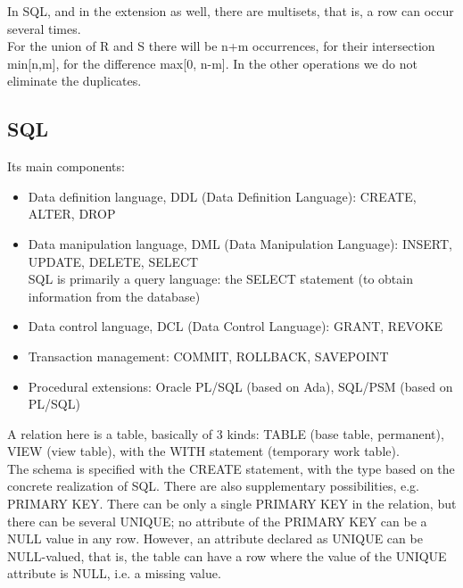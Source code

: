 \documentclass[margin=0px]{article}
\begin{document}
In SQL, and in the extension as well, there are multisets, that is, a row can occur several times. \\
For the union of R and S there will be n+m occurrences, for their intersection min[n,m], for the difference max[0, n-m]. In the other operations we do not eliminate the duplicates.

\subsection{SQL}

Its main components:
\begin{itemize}
    \item Data definition language, DDL (Data Definition Language): CREATE, ALTER, DROP
    \item Data manipulation language, DML (Data Manipulation Language): INSERT, UPDATE, DELETE, SELECT \\
          SQL is primarily a query language: the SELECT statement (to obtain information from the database)
    \item Data control language, DCL (Data Control Language): GRANT, REVOKE
    \item Transaction management: COMMIT, ROLLBACK, SAVEPOINT
    \item Procedural extensions: Oracle PL/SQL (based on Ada), SQL/PSM (based on PL/SQL)
\end{itemize}
A relation here is a table, basically of 3 kinds: TABLE (base table, permanent), VIEW (view table), with the WITH statement (temporary work table).\\
The schema is specified with the CREATE statement, with the type based on the concrete realization of SQL. There are also supplementary possibilities, e.g. PRIMARY KEY. There can be only a single PRIMARY KEY in the relation, but there can be several UNIQUE; no attribute of the PRIMARY KEY can be a NULL value in any row. However, an attribute declared as UNIQUE can be NULL-valued, that is, the table can have a row where the value of the UNIQUE attribute is NULL, i.e. a missing value. \\ \\
\end{document}
